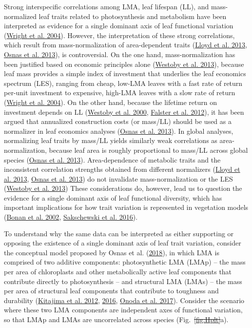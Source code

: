 \documentclass[
  12pt,
  a4paper,
,tablecaptionabove
]{scrartcl}
\providecommand{\DIFaddtex}[1]{{\protect\color{blue}\uwave{#1}}} %
\providecommand{\DIFdeltex}[1]{{\protect\color{red}\sout{#1}}}                      %
\providecommand{\DIFaddbegin}{} %
\providecommand{\DIFaddend}{} %
\providecommand{\DIFdelbegin}{} %
\providecommand{\DIFdelend}{} %
\providecommand{\DIFadd}[1]{\texorpdfstring{\DIFaddtex{#1}}{#1}} %
\providecommand{\DIFdel}[1]{\texorpdfstring{\DIFdeltex{#1}}{}} %
\newcommand{\DIFscaledelfig}{0.5}
\newlength{\DIFdelgraphicswidth} %
\newlength{\DIFdelgraphicsheight} %
\newcommand{\DIFaddincludegraphics}[2][]{{\color{blue}\fbox{\DIFOincludegraphics[#1]{#2}}}} %
\newcommand{\DIFdelincludegraphics}[2][]{%
\sbox{\DIFdelgraphicsbox}{\DIFOincludegraphics[#1]{#2}}%
\settoboxwidth{\DIFdelgraphicswidth}{\DIFdelgraphicsbox} %
\settoboxtotalheight{\DIFdelgraphicsheight}{\DIFdelgraphicsbox} %
\scalebox{\DIFscaledelfig}{%
\parbox[b]{\DIFdelgraphicswidth}{\usebox{\DIFdelgraphicsbox}\\[-\baselineskip] \rule{\DIFdelgraphicswidth}{0em}}\llap{\resizebox{\DIFdelgraphicswidth}{\DIFdelgraphicsheight}{%
\setlength{\unitlength}{\DIFdelgraphicswidth}%
\begin{picture}(1,1)%
\thicklines\linethickness{2pt} %
{\color[rgb]{1,0,0}\put(0,0){\framebox(1,1){}}}%
{\color[rgb]{1,0,0}\put(0,0){\line( 1,1){1}}}%
{\color[rgb]{1,0,0}\put(0,1){\line(1,-1){1}}}%
\end{picture}%
}\hspace*{3pt}}} %
} %
\DeclareRobustCommand{\DIFaddbegin}{\DIFOaddbegin \let\includegraphics\DIFaddincludegraphics} %
\DeclareRobustCommand{\DIFaddend}{\DIFOaddend \let\includegraphics\DIFOincludegraphics} %
\DeclareRobustCommand{\DIFdelbegin}{\DIFOdelbegin \let\includegraphics\DIFdelincludegraphics} %
\DeclareRobustCommand{\DIFdelend}{\DIFOaddend \let\includegraphics\DIFOincludegraphics} %
\begin{document}
Strong interspecific correlations among LMA, leaf lifespan (LL), and
mass-normalized leaf traits related to photosynthesis and metabolism
have been interpreted as evidence for a single dominant axis of leaf
functional variation (\protect\hyperlink{ref-Wright2004a}{Wright et al.
2004}). However, the interpretation of these strong correlations, which
result from mass-normalization of area-dependent traits
(\protect\hyperlink{ref-Lloyd2013}{Lloyd et al. 2013},
\protect\hyperlink{ref-Osnas2013}{Osnas et al. 2013}), is controversial.
On the one hand, mass-normalization has been justified based on economic
principles alone (\protect\hyperlink{ref-Westoby2013}{Westoby et al.
2013}), because leaf mass provides a simple index of investment that
underlies the leaf economics spectrum (LES), ranging from cheap, low-LMA
leaves with a fast rate of return per-unit investment to expensive,
high-LMA leaves with a slow rate of return
(\protect\hyperlink{ref-Wright2004a}{Wright et al. 2004}). On the other
hand, because the lifetime return on investment depends on LL
(\protect\hyperlink{ref-Westoby2000}{Westoby et al. 2000},
\protect\hyperlink{ref-Falster2012}{Falster et al. 2012}), it has been
argued that annualized construction costs (or mass/LL) should be used as
a normalizer in leaf economics analyses
(\protect\hyperlink{ref-Osnas2013}{Osnas et al. 2013}). In global
analyses, normalizing leaf traits by mass/LL yields similarly weak
correlations as area-normalization, because leaf area is roughly
proportional to mass/LL across global species
(\protect\hyperlink{ref-Osnas2013}{Osnas et al. 2013}). Area-dependence
of metabolic traits and the inconsistent correlation strengths obtained
from different normalizers (\protect\hyperlink{ref-Lloyd2013}{Lloyd et
al. 2013}, \protect\hyperlink{ref-Osnas2013}{Osnas et al. 2013}) do not
invalidate mass-normalization or the LES
(\protect\hyperlink{ref-Westoby2013}{Westoby et al. 2013}) These
considerations do, however, lead us to question the evidence for a
single dominant axis of leaf functional diversity, which has important
implications for how trait variation is represented in vegetation models
(\protect\hyperlink{ref-Bonan2002}{Bonan et al. 2002},
\protect\hyperlink{ref-Sakschewski2016}{Sakschewski et al. 2016}).

To understand why the same data can be interpreted as either supporting
or opposing the existence of a single dominant axis of leaf trait
variation, consider the conceptual model proposed by Osnas et al.
(\protect\hyperlink{ref-Osnas2018}{2018}), in which LMA is comprised of
two additive components: photosynthetic LMA (LMAp) -- the mass per area
of chloroplasts and other metabolically active leaf components that
contribute directly to photosynthesis -- and structural LMA (LMAs) --
the mass per area of structural leaf components that contribute to
toughness and durability (\protect\hyperlink{ref-Kitajima2012}{Kitajima
et al. 2012}, \protect\hyperlink{ref-Kitajima2016}{2016},
\protect\hyperlink{ref-Onoda2017}{Onoda et al. 2017}). Consider the
scenario where these two LMA components are independent axes of
functional variation, so that LMAp and LMAs are uncorrelated across
species (Fig.~\DIFdelbegin \DIFdel{\ref{fig:Hplt}}\DIFdelend \DIFaddbegin \DIFadd{\ref{fig-Hplt}}\DIFaddend a).
\DIFaddbegin 
\end{document}
